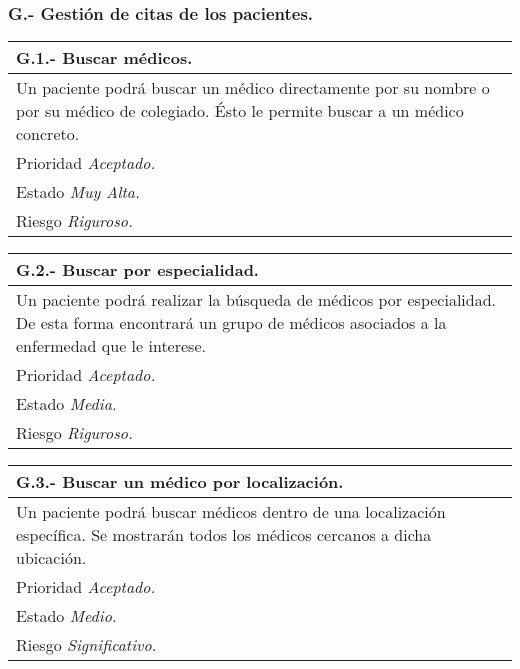 	\subsubsection{G.- Gestión de citas de los pacientes.}

	\begin{center}
	\begin{tabulary}{15cm}{|L|}
		\hline
			\bf{G.1.- Buscar médicos.} \\
		\hline
			Un paciente podrá buscar un médico directamente por su nombre o por su médico de colegiado. Ésto le permite buscar a un médico concreto. \\
		\hline
			Prioridad \textit{Aceptado.} \\
		\hline
			Estado \textit{Muy Alta.} \\
		\hline
			Riesgo \textit{Riguroso.} \\
		\hline
	\end{tabulary}
	\end{center}

	\begin{center}
	\begin{tabulary}{15cm}{|L|}
		\hline
			\bf{G.2.- Buscar por especialidad.} \\
		\hline
			Un paciente podrá realizar la búsqueda de médicos por especialidad. De esta forma encontrará un grupo de médicos asociados a la enfermedad que le interese. \\
		\hline
			Prioridad \textit{Aceptado.} \\
		\hline
			Estado \textit{Media.} \\
		\hline
			Riesgo \textit{Riguroso.} \\
		\hline
	\end{tabulary}
	\end{center}

	\begin{center}
	\begin{tabulary}{15cm}{|L|}
		\hline
			\bf{G.3.- Buscar un médico por localización.} \\
		\hline
			Un paciente podrá buscar médicos dentro de una localización específica. Se mostrarán todos los médicos cercanos a dicha ubicación. \\
		\hline
			Prioridad \textit{Aceptado.} \\
		\hline
			Estado \textit{Medio.} \\
		\hline
			Riesgo \textit{Significativo.} \\
		\hline
	\end{tabulary}
	\end{center}

